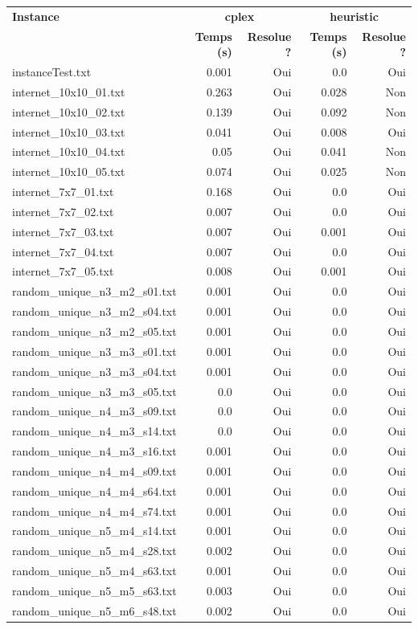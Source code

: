 \documentclass{article}
\begin{document}
\begin{center}
\renewcommand{\arraystretch}{1.3}
\begin{tabular}{lrrrr}
\hline
\textbf{Instance} & \multicolumn{2}{c}{\textbf{cplex}} & \multicolumn{2}{c}{\textbf{heuristic}}\\
 & \textbf{Temps (s)} & \textbf{Resolue ?} & \textbf{Temps (s)} & \textbf{Resolue ?}\\ \hline
instanceTest.txt & 0.001 & Oui & 0.0 & Oui\\
internet\_10x10\_01.txt & 0.263 & Oui & 0.028 & Non\\
internet\_10x10\_02.txt & 0.139 & Oui & 0.092 & Non\\
internet\_10x10\_03.txt & 0.041 & Oui & 0.008 & Oui\\
internet\_10x10\_04.txt & 0.05 & Oui & 0.041 & Non\\
internet\_10x10\_05.txt & 0.074 & Oui & 0.025 & Non\\
internet\_7x7\_01.txt & 0.168 & Oui & 0.0 & Oui\\
internet\_7x7\_02.txt & 0.007 & Oui & 0.0 & Oui\\
internet\_7x7\_03.txt & 0.007 & Oui & 0.001 & Oui\\
internet\_7x7\_04.txt & 0.007 & Oui & 0.0 & Oui\\
internet\_7x7\_05.txt & 0.008 & Oui & 0.001 & Oui\\
random\_unique\_n3\_m2\_s01.txt & 0.001 & Oui & 0.0 & Oui\\
random\_unique\_n3\_m2\_s04.txt & 0.001 & Oui & 0.0 & Oui\\
random\_unique\_n3\_m2\_s05.txt & 0.001 & Oui & 0.0 & Oui\\
random\_unique\_n3\_m3\_s01.txt & 0.001 & Oui & 0.0 & Oui\\
random\_unique\_n3\_m3\_s04.txt & 0.001 & Oui & 0.0 & Oui\\
random\_unique\_n3\_m3\_s05.txt & 0.0 & Oui & 0.0 & Oui\\
random\_unique\_n4\_m3\_s09.txt & 0.0 & Oui & 0.0 & Oui\\
random\_unique\_n4\_m3\_s14.txt & 0.0 & Oui & 0.0 & Oui\\
random\_unique\_n4\_m3\_s16.txt & 0.001 & Oui & 0.0 & Oui\\
random\_unique\_n4\_m4\_s09.txt & 0.001 & Oui & 0.0 & Oui\\
random\_unique\_n4\_m4\_s64.txt & 0.001 & Oui & 0.0 & Oui\\
random\_unique\_n4\_m4\_s74.txt & 0.001 & Oui & 0.0 & Oui\\
random\_unique\_n5\_m4\_s14.txt & 0.001 & Oui & 0.0 & Oui\\
random\_unique\_n5\_m4\_s28.txt & 0.002 & Oui & 0.0 & Oui\\
random\_unique\_n5\_m4\_s63.txt & 0.001 & Oui & 0.0 & Oui\\
random\_unique\_n5\_m5\_s63.txt & 0.003 & Oui & 0.0 & Oui\\
random\_unique\_n5\_m6\_s48.txt & 0.002 & Oui & 0.0 & Oui\\
\hline
\end{tabular}
\end{center}
\end{document}

